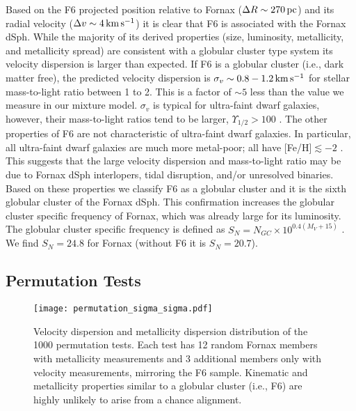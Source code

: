 \documentclass[twocolumn]{aastex63}
\begin{document}
Based on the F6 projected position relative to Fornax ($\Delta R \sim 270 \mathrm{\,pc}$) and its radial velocity ($\Delta v \sim 4 \mathrm{\,km} \mathrm{\,s}^{-1}$) it is clear that F6 is associated with the Fornax dSph.  
While the majority of its derived properties (size, luminosity, metallicity, and metallicity spread) are consistent with a globular cluster type system its velocity dispersion is larger than expected.
If F6 is a globular cluster (i.e., dark matter free), the predicted velocity dispersion is $\sigma_v\sim0.8-1.2 \mathrm{\,km} \mathrm{\,s}^{-1}$ for  stellar mass-to-light ratio between 1 to 2.
This is a factor of $\sim5$ less than the value we measure in our mixture model. 
$\sigma_v$ is typical for ultra-faint dwarf galaxies, however, their mass-to-light ratios tend to be larger, $\Upsilon_{1/2}>100$  \citep[e.g.,][]{Simon2019ARA&A..57..375S}. 
The other properties of F6 are not characteristic of ultra-faint dwarf galaxies.  In particular, all ultra-faint dwarf galaxies are much more metal-poor; all have  [Fe/H]$\lesssim-2$ \citep{Simon2019ARA&A..57..375S}.  
This suggests that the large velocity dispersion and mass-to-light ratio may be due to  Fornax dSph interlopers, tidal disruption, and/or unresolved binaries. 
Based on these properties we classify F6 as a globular cluster and it is the sixth globular cluster of the Fornax dSph.
This confirmation increases the globular cluster specific frequency of Fornax, which was already large for its luminosity. 
The globular cluster specific frequency is defined as $S_N = N_{GC} \times 10^{0.4 (M_V + 15)} $ \citep{Harris1981AJ.....86.1627H}. 
We find $S_N=24.8$ for Fornax (without F6 it is $S_N=20.7$). 


\subsection{Permutation Tests}

\begin{figure}
\texttt{[image: permutation\_sigma\_sigma.pdf]}
\caption{Velocity dispersion and metallicity dispersion distribution of the 1000  permutation tests.  Each test has 12 random Fornax members with metallicity measurements and 3 additional members only with velocity measurements, mirroring the F6 sample. 
Kinematic and metallicity properties similar to a globular cluster (i.e., F6) are highly unlikely to arise from a chance alignment. 
}
\label{fig:permuation_both}
\end{figure}
\end{document}
